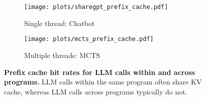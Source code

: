 \begin{figure}[t]
\centering
\begin{subfigure}[b]{0.49\columnwidth}
    \texttt{[image: plots/sharegpt\_prefix\_cache.pdf]}
    \caption{Single thread: Chatbot}
    \label{fig:sharegpt_prefix}
\end{subfigure}
\hfill
\begin{subfigure}[b]{0.49\columnwidth}
    \texttt{[image: plots/mcts\_prefix\_cache.pdf]}
    \caption{Multiple threads: MCTS}
    \label{fig:mcts_prefix}
\end{subfigure}
\caption{\small \textbf{Prefix cache hit rates for LLM calls within and across programs.} LLM calls within the same program often share KV cache, whereas LLM calls across programs typically do not.}
\label{fig:prefix_cache}
\vspace{-6mm}
\end{figure}
